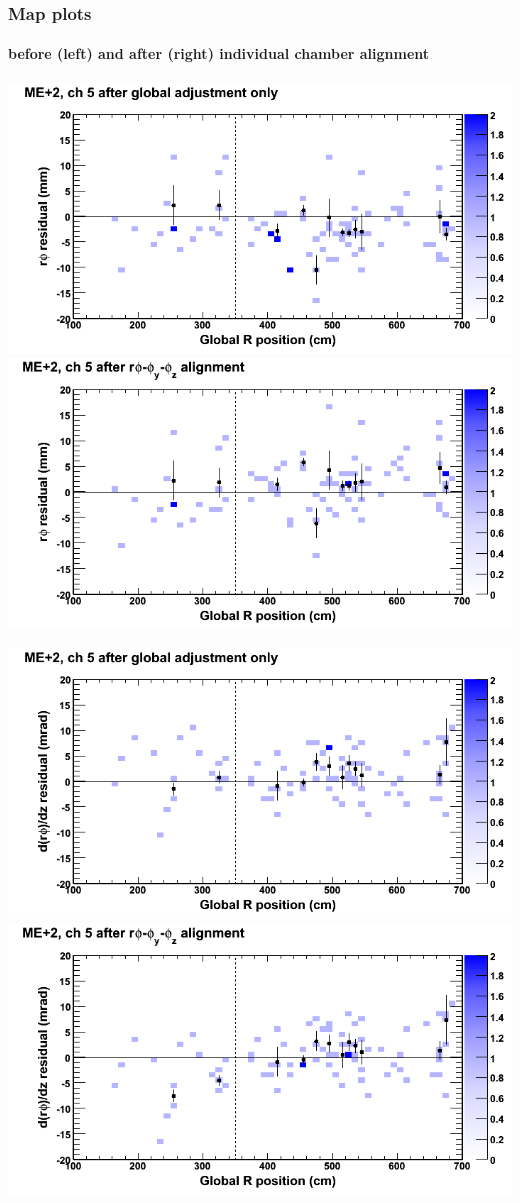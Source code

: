 \documentclass[compress]{beamer}
\begin{document}
\begin{frame}
\frametitle{Map plots}
\framesubtitle{before (left) and after (right) individual chamber alignment}
\includegraphics[width=0.5\linewidth]{ringmapplots_3dof/before_CSCvsr_mep2ch05_x.png} \includegraphics[width=0.5\linewidth]{ringmapplots_3dof/after_CSCvsr_mep2ch05_x.png}

\includegraphics[width=0.5\linewidth]{ringmapplots_3dof/before_CSCvsr_mep2ch05_dxdz.png} \includegraphics[width=0.5\linewidth]{ringmapplots_3dof/after_CSCvsr_mep2ch05_dxdz.png}
\end{frame}
\end{document}
